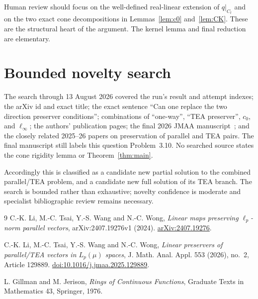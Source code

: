 \documentclass[11pt]{article}
\begin{document}
Human review should focus on the well-defined real-linear extension of
$q|_{C_t}$ and on the two exact cone decompositions in
Lemmas~\ref{lem:c0} and~\ref{lem:CK}.  These are the structural heart of the
argument.  The kernel lemma and final reduction are elementary.

\section{Bounded novelty search}

The search through 13 August 2026 covered the run's result and attempt
indexes; the arXiv id and exact title; the exact sentence ``Can one replace
the two direction preserver conditions''; combinations of ``one-way'',
``TEA preserver'', $c_0$, and $\ell_\infty$; the authors' publication pages;
the final 2026 JMAA manuscript~\cite{LTWW26}; and the closely related 2025--26
papers on preservation of parallel and TEA pairs.  The final manuscript
still labels this question Problem~3.10.  No searched source states the cone
rigidity lemma or Theorem~\ref{thm:main}.

Accordingly this is classified as a candidate new partial solution to the
combined parallel/TEA problem, and a candidate new full solution of its TEA
branch.  The search is bounded rather than exhaustive; novelty confidence is
moderate and specialist bibliographic review remains necessary.

\small
\begin{thebibliography}{9}
C.-K. Li, M.-C. Tsai, Y.-S. Wang and N.-C. Wong,
\emph{Linear maps preserving $\ell_p$-norm parallel vectors},
arXiv:2407.19276v1 (2024).
\href{https://arxiv.org/abs/2407.19276}{arXiv:2407.19276}.

C.-K. Li, M.-C. Tsai, Y.-S. Wang and N.-C. Wong,
\emph{Linear preservers of parallel/TEA vectors in $L_p(\mu)$ spaces},
J. Math. Anal. Appl. 553 (2026), no.~2, Article 129889.
\href{https://doi.org/10.1016/j.jmaa.2025.129889}{doi:10.1016/j.jmaa.2025.129889}.

L. Gillman and M. Jerison,
\emph{Rings of Continuous Functions},
Graduate Texts in Mathematics 43, Springer, 1976.
\end{thebibliography}
\end{document}
